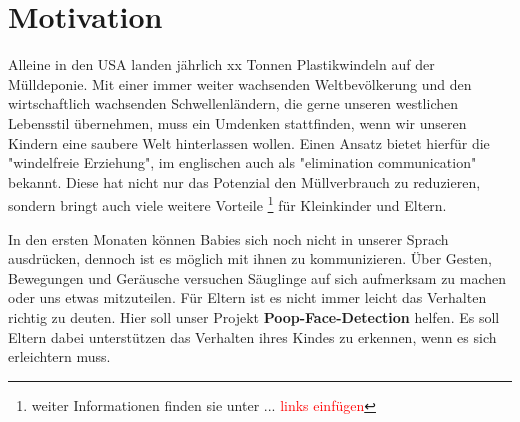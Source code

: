 \section{Motivation}
\label{sec:Motivation}
Alleine in den USA landen jährlich xx Tonnen Plastikwindeln auf der Mülldeponie. Mit einer immer weiter wachsenden Weltbevölkerung und den wirtschaftlich wachsenden Schwellenländern, die gerne unseren westlichen Lebensstil übernehmen,
muss ein Umdenken stattfinden, wenn wir unseren Kindern eine saubere Welt hinterlassen wollen. Einen Ansatz bietet hierfür die "windelfreie Erziehung", im englischen auch als "elimination communication" bekannt. Diese hat nicht nur das Potenzial den Müllverbrauch zu reduzieren, sondern bringt auch viele weitere Vorteile \footnote{ weiter Informationen finden sie unter ... \textcolor{red}{links einfügen}} für Kleinkinder und Eltern.

In den ersten Monaten können Babies sich noch nicht in unserer Sprach ausdrücken, dennoch ist es möglich mit ihnen zu kommunizieren. Über Gesten, Bewegungen und Geräusche versuchen Säuglinge auf sich aufmerksam zu machen oder uns etwas mitzuteilen. Für Eltern ist es nicht immer leicht das Verhalten richtig zu deuten. Hier soll unser Projekt \textbf{Poop-Face-Detection} helfen. Es soll Eltern dabei unterstützen das Verhalten ihres Kindes zu erkennen, wenn es sich erleichtern muss.
